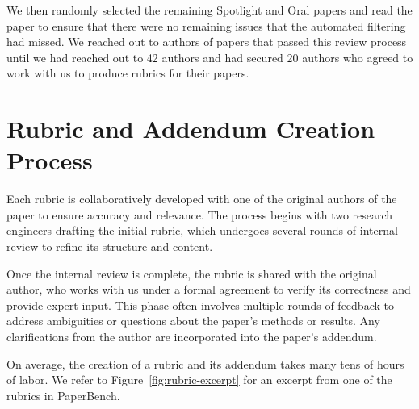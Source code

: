 \documentclass{article}
\theoremstyle{plain}
\theoremstyle{definition}
\theoremstyle{remark}
\begin{document}
We then randomly selected the remaining Spotlight and Oral papers and read the paper to ensure that there were no remaining issues that the automated filtering had missed. We reached out to authors of papers that passed this review process until we had reached out to 42 authors and had secured 20 authors who agreed to work with us to produce rubrics for their papers.

\section{Rubric and Addendum Creation Process}
\label{app: rubric-creation-process}
Each rubric is collaboratively developed with one of the original authors of the paper to ensure accuracy and relevance. The process begins with two research engineers drafting the initial rubric, which undergoes several rounds of internal review to refine its structure and content. 

Once the internal review is complete, the rubric is shared with the original author, who works with us under a formal agreement to verify its correctness and provide expert input. This phase often involves multiple rounds of feedback to address ambiguities or questions about the paper’s methods or results. Any clarifications from the author are incorporated into the paper's addendum. 

On average, the creation of a rubric and its addendum takes many tens of hours of labor. We refer to Figure~\ref{fig:rubric-excerpt} for an excerpt from one of the rubrics in PaperBench.
\end{document}
